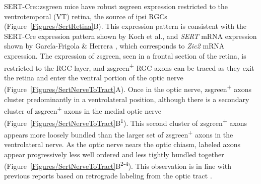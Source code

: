 SERT-Cre::zsgreen mice have robust zsgreen expression restricted to the ventrotemporal (VT) retina, the source of ipsi RGCs (Figure~\ref{Figures/SertRetina}B).
This expression pattern is consistent with the SERT-Cre expression pattern shown by Koch et al.,  and \emph{SERT} mRNA expression shown by Garc\'ia-Frigola \& Herrera , which corresponds to \emph{Zic2} mRNA expression.
The expression of zsgreen, seen in a frontal section of the retina, is restricted to the RGC layer, and zsgreen\textsuperscript{+} RGC axons can be traced as they exit the retina and enter the ventral portion of the optic nerve (Figure~\ref{Figures/SertNerveToTract}A).
Once in the optic nerve, zsgreen\textsuperscript{+} axons cluster predominantly in a ventrolateral position, although there is a secondary cluster of zsgreen\textsuperscript{+} axons in the medial optic nerve (Figure~\ref{Figures/SertNerveToTract}B\textsuperscript{1}).
This second cluster of zsgreen\textsuperscript{+} axons appears more loosely bundled than the larger set of zsgreen\textsuperscript{+} axons in the ventrolateral nerve.
As the optic nerve nears the optic chiasm, labeled axons appear progressively less well ordered and less tightly bundled together (Figure~\ref{Figures/SertNerveToTract}B\textsuperscript{2-4}).
This observation is in line with previous reports based on retrograde labeling from the optic tract \cite{colello1990early}.

